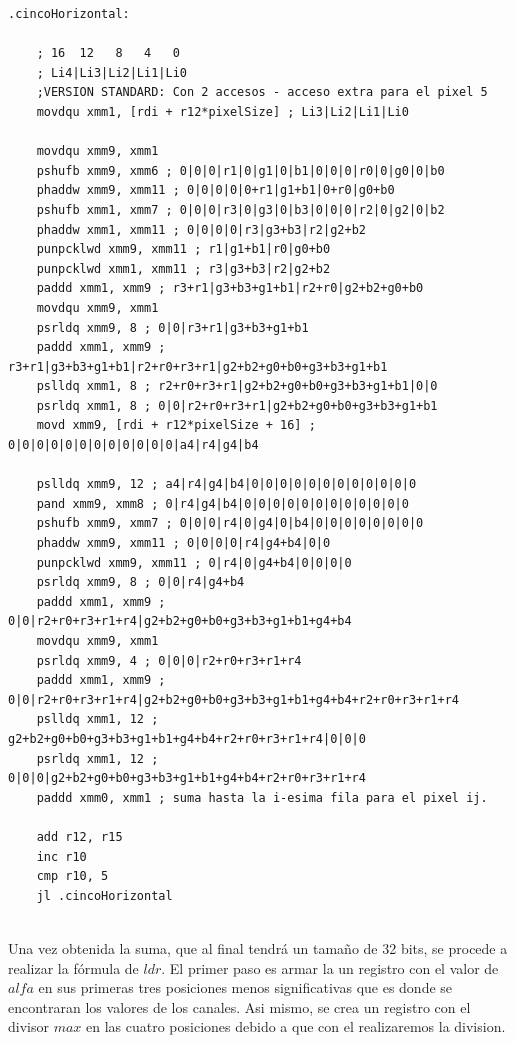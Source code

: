 \begin{codesnippet}
\begin{verbatim}
.cincoHorizontal:

	; 16  12   8   4   0
	; Li4|Li3|Li2|Li1|Li0
    ;VERSION STANDARD: Con 2 accesos - acceso extra para el pixel 5
    movdqu xmm1, [rdi + r12*pixelSize] ; Li3|Li2|Li1|Li0

	movdqu xmm9, xmm1
	pshufb xmm9, xmm6 ; 0|0|0|r1|0|g1|0|b1|0|0|0|r0|0|g0|0|b0
	phaddw xmm9, xmm11 ; 0|0|0|0|0+r1|g1+b1|0+r0|g0+b0
	pshufb xmm1, xmm7 ; 0|0|0|r3|0|g3|0|b3|0|0|0|r2|0|g2|0|b2
    phaddw xmm1, xmm11 ; 0|0|0|0|r3|g3+b3|r2|g2+b2
    punpcklwd xmm9, xmm11 ; r1|g1+b1|r0|g0+b0
    punpcklwd xmm1, xmm11 ; r3|g3+b3|r2|g2+b2
    paddd xmm1, xmm9 ; r3+r1|g3+b3+g1+b1|r2+r0|g2+b2+g0+b0
    movdqu xmm9, xmm1
    psrldq xmm9, 8 ; 0|0|r3+r1|g3+b3+g1+b1
    paddd xmm1, xmm9 ; r3+r1|g3+b3+g1+b1|r2+r0+r3+r1|g2+b2+g0+b0+g3+b3+g1+b1
    pslldq xmm1, 8 ; r2+r0+r3+r1|g2+b2+g0+b0+g3+b3+g1+b1|0|0
    psrldq xmm1, 8 ; 0|0|r2+r0+r3+r1|g2+b2+g0+b0+g3+b3+g1+b1
	movd xmm9, [rdi + r12*pixelSize + 16] ; 0|0|0|0|0|0|0|0|0|0|0|0|a4|r4|g4|b4

	pslldq xmm9, 12 ; a4|r4|g4|b4|0|0|0|0|0|0|0|0|0|0|0|0
	pand xmm9, xmm8 ; 0|r4|g4|b4|0|0|0|0|0|0|0|0|0|0|0|0
	pshufb xmm9, xmm7 ; 0|0|0|r4|0|g4|0|b4|0|0|0|0|0|0|0|0
	phaddw xmm9, xmm11 ; 0|0|0|0|r4|g4+b4|0|0
	punpcklwd xmm9, xmm11 ; 0|r4|0|g4+b4|0|0|0|0
	psrldq xmm9, 8 ; 0|0|r4|g4+b4
	paddd xmm1, xmm9 ; 0|0|r2+r0+r3+r1+r4|g2+b2+g0+b0+g3+b3+g1+b1+g4+b4
	movdqu xmm9, xmm1
	psrldq xmm9, 4 ; 0|0|0|r2+r0+r3+r1+r4
	paddd xmm1, xmm9 ; 0|0|r2+r0+r3+r1+r4|g2+b2+g0+b0+g3+b3+g1+b1+g4+b4+r2+r0+r3+r1+r4
	pslldq xmm1, 12 ; g2+b2+g0+b0+g3+b3+g1+b1+g4+b4+r2+r0+r3+r1+r4|0|0|0
	psrldq xmm1, 12 ; 0|0|0|g2+b2+g0+b0+g3+b3+g1+b1+g4+b4+r2+r0+r3+r1+r4
	paddd xmm0, xmm1 ; suma hasta la i-esima fila para el pixel ij.

	add r12, r15
	inc r10
	cmp r10, 5
	jl .cincoHorizontal
    
\end{verbatim}
\end{codesnippet}

Una vez obtenida la suma, que al final tendrá un tamaño de 32 bits, se procede a realizar la fórmula de $ldr$. 
El primer paso es armar la un registro con el valor de $alfa$ en sus primeras tres posiciones menos significativas que es donde se encontraran los valores de los canales. Asi mismo, se crea un registro con el divisor $max$ en las cuatro posiciones debido a que con el realizaremos la division.\\

